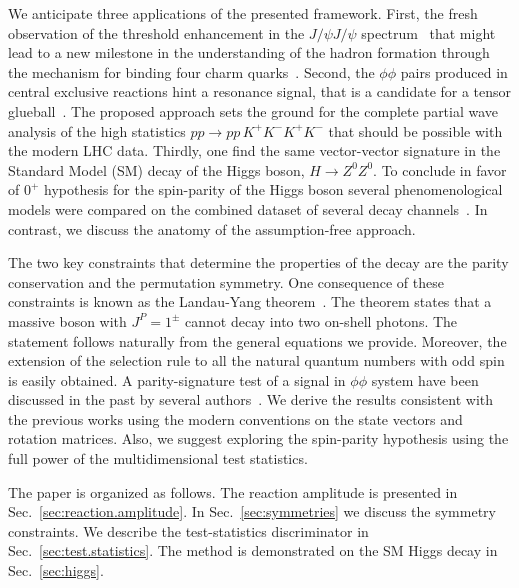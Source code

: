 \documentclass[prd,preprintnumbers,floatfix,
nofootinbib,superscriptaddress]{revtex4}
\begin{document}
We anticipate three applications of the presented framework.
First, the fresh observation of the threshold enhancement in the $J/\psi J/\psi$ spectrum~\cite{Aaij:2020xyz}
that might lead to a new milestone in the understanding of the hadron formation through the mechanism for binding four charm quarks~\cite{Liu:2019zoy}.
Second, the $\phi\phi$ pairs produced in central exclusive reactions hint a resonance signal, that is a candidate for a tensor glueball~\cite{Barberis:2000em,Lebiedowicz:2019jru}.
The proposed approach sets the ground for the complete partial wave analysis of the high statistics $pp\to pp\,K^+K^-K^+K^-$ that
should be possible with the modern LHC data.
Thirdly, one find the same vector-vector signature in the Standard Model (SM) decay of the Higgs boson, $H\to Z^0Z^0$.
To conclude in favor of $0^+$ hypothesis for the spin-parity of the Higgs boson
several phenomenological models were compared on the combined dataset of several decay channels~\cite{Aad:2013xqa,CMS:2018mmw}.
In contrast, we discuss the anatomy of the assumption-free approach.

The two key constraints that determine the properties of the decay are the parity conservation and the permutation symmetry.
One consequence of these constraints is known as the Landau-Yang theorem~\cite{Yang:1950rg,Landau:1948kw}.
The theorem states that a massive boson with $J^P = 1^\pm$ cannot decay into two on-shell photons.
The statement follows naturally from the general equations we provide. Moreover, the extension of the selection rule to all the natural quantum numbers with odd spin is easily obtained.
A parity-signature test of a signal in $\phi\phi$ system have been discussed in the past by several authors~\cite{Trueman:1978kh,Chang:1978jb,Collins:1977iv,Trueman:1978kh,Trueman:1978kh}.
We derive the results consistent with the previous works using the modern conventions on the state vectors and rotation matrices.
Also, we suggest exploring the spin-parity hypothesis using the full power of the multidimensional test statistics.

The paper is organized as follows. The reaction amplitude is presented in Sec.~\ref{sec:reaction.amplitude}.
In Sec.~\ref{sec:symmetries} we discuss the symmetry constraints.
We describe the test-statistics discriminator in Sec.~\ref{sec:test.statistics}.
The method is demonstrated on the SM Higgs decay in Sec.~\ref{sec:higgs}.

\end{document}
